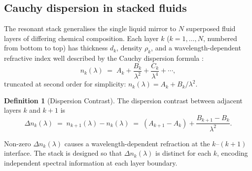 \documentclass[11pt,twocolumn,a4paper]{article}
\theoremstyle{plain}
\theoremstyle{definition}
\newtheorem{definition}[theorem]{Definition}
\theoremstyle{remark}
\begin{document}
\subsection{Cauchy dispersion in stacked fluids}

The resonant stack generalises the single liquid mirror to $N$ superposed fluid layers of differing chemical composition. Each layer $k$ ($k=1,\ldots,N$, numbered from bottom to top) has thickness $d_k$, density $\rho_k$, and a wavelength-dependent refractive index well described by the Cauchy dispersion formula \cite{Cauchy1836}:
\begin{equation}
\label{eq:cauchy}
  n_k(\lambda) \;=\; A_k + \frac{B_k}{\lambda^2} + \frac{C_k}{\lambda^4} + \cdots,
\end{equation}
truncated at second order for simplicity: $n_k(\lambda) = A_k + B_k/\lambda^2$.

\begin{definition}[Dispersion Contrast]
The dispersion contrast between adjacent layers $k$ and $k+1$ is
\begin{equation}
  \Delta n_k(\lambda) \;=\; n_{k+1}(\lambda) - n_k(\lambda) \;=\; (A_{k+1}-A_k) + \frac{B_{k+1}-B_k}{\lambda^2}.
\end{equation}
\end{definition}

Non-zero $\Delta n_k(\lambda)$ causes a wavelength-dependent refraction at the $k$--$(k+1)$ interface. The stack is designed so that $\Delta n_k(\lambda)$ is distinct for each $k$, encoding independent spectral information at each layer boundary.
\end{document}
